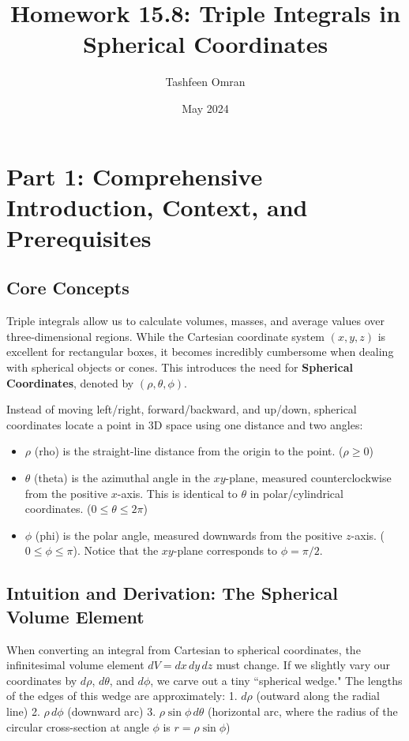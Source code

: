 \documentclass[12pt]{article}
\title{\textbf{Homework 15.8: Triple Integrals in Spherical Coordinates}}
\author{Tashfeen Omran}
\date{May 2024}
\begin{document}
\maketitle
\tableofcontents
\newpage

\section{Part 1: Comprehensive Introduction, Context, and Prerequisites}

\subsection{Core Concepts}
Triple integrals allow us to calculate volumes, masses, and average values over three-dimensional regions. While the Cartesian coordinate system $(x, y, z)$ is excellent for rectangular boxes, it becomes incredibly cumbersome when dealing with spherical objects or cones. This introduces the need for \textbf{Spherical Coordinates}, denoted by $(\rho, \theta, \phi)$.

Instead of moving left/right, forward/backward, and up/down, spherical coordinates locate a point in 3D space using one distance and two angles:
\begin{itemize}
    \item $\rho$ (rho) is the straight-line distance from the origin to the point. ($\rho \ge 0$)
    \item $\theta$ (theta) is the azimuthal angle in the $xy$-plane, measured counterclockwise from the positive $x$-axis. This is identical to $\theta$ in polar/cylindrical coordinates. ($0 \le \theta \le 2\pi$)
    \item $\phi$ (phi) is the polar angle, measured downwards from the positive $z$-axis. ($0 \le \phi \le \pi$). Notice that the $xy$-plane corresponds to $\phi = \pi/2$.
\end{itemize}

\subsection{Intuition and Derivation: The Spherical Volume Element}
When converting an integral from Cartesian to spherical coordinates, the infinitesimal volume element $dV = dx \, dy \, dz$ must change. If we slightly vary our coordinates by $d\rho$, $d\theta$, and $d\phi$, we carve out a tiny ``spherical wedge."
The lengths of the edges of this wedge are approximately:
1. $d\rho$ (outward along the radial line)
2. $\rho \, d\phi$ (downward arc)
3. $\rho \sin\phi \, d\theta$ (horizontal arc, where the radius of the circular cross-section at angle $\phi$ is $r = \rho \sin\phi$)
\end{document}
